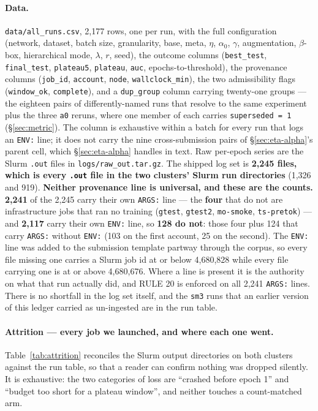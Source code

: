\documentclass[10pt,letterpaper]{article}
\newcommand{\plateau}{\texttt{plateau5}}
\newcommand{\arm}[1]{\texttt{#1}}
\begin{document}
\paragraph{Data.}
\texttt{data/all\_runs.csv}, 2{,}177 rows, one per run, with the full configuration (network,
dataset, batch size, granularity, base, meta, $\eta$, $\alpha_0$, $\gamma$, augmentation,
$\beta$-box, hierarchical mode, $\lambda$, $r$, seed), the outcome columns (\texttt{best\_test},
\texttt{final\_test}, \plateau, \texttt{plateau}, \texttt{auc}, epochs-to-threshold), the
provenance columns (\texttt{job\_id}, \texttt{account}, \texttt{node}, \texttt{wallclock\_min}),
the two admissibility flags (\texttt{window\_ok}, \texttt{complete}), and a \texttt{dup\_group}
column carrying twenty-one groups --- the eighteen pairs of differently-named runs that resolve to
the same experiment plus the three \arm{a0} reruns, where one member of each carries
\texttt{superseded = 1} (\S\ref{sec:metric}). The column is exhaustive within a batch for every
run that logs an \texttt{ENV:} line; it does not carry the nine cross-submission pairs of
\S\ref{sec:eta-alpha}'s parent cell, which \S\ref{sec:eta-alpha} handles in text.
Raw per-epoch series are the Slurm \texttt{.out} files in
\texttt{logs/raw\_out.tar.gz}. The shipped log set is \textbf{2{,}245 files, which is every
\texttt{.out} file in the two clusters' Slurm run directories} (1{,}326 and 919).
\textbf{Neither provenance line is universal, and these are the counts.} \textbf{2{,}241} of the
2{,}245 carry their own \texttt{ARGS:} line --- the \textbf{four} that do not are infrastructure
jobs that ran no training (\texttt{gtest}, \texttt{gtest2}, \texttt{mo-smoke},
\texttt{ts-pretok}) --- and \textbf{2{,}117} carry their own \texttt{ENV:} line, so \textbf{128
do not}: those four plus 124 that carry \texttt{ARGS:} without \texttt{ENV:} (103 on the first
account, 25 on the second). The \texttt{ENV:} line was added to the submission template partway
through the corpus, so every file missing one carries a Slurm job id at or below 4{,}680{,}828
while every file carrying one is at or above 4{,}680{,}676. Where a line is present it is the
authority on what that run actually did, and RULE 20 is enforced on all 2{,}241 \texttt{ARGS:}
lines. There is no shortfall in the log set itself, and the \arm{sm3} runs that an earlier
version of this ledger carried as un-ingested are in the run table.

\paragraph{Attrition --- every job we launched, and where each one went.}
Table~\ref{tab:attrition} reconciles the Slurm output directories on both clusters against the run
table, so that a reader can confirm nothing was dropped silently. It is exhaustive: the two
categories of loss are ``crashed before epoch 1'' and ``budget too short for a plateau window'',
and neither touches a count-matched arm.
\end{document}

